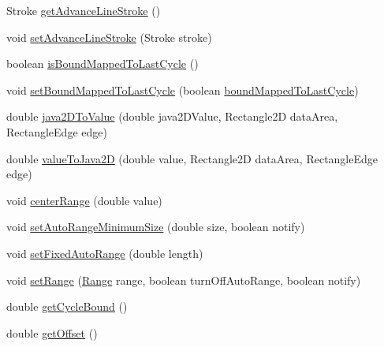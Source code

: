 \begin{DoxyCompactItemize}
Stroke \mbox{\hyperlink{classorg_1_1jfree_1_1chart_1_1axis_1_1_cyclic_number_axis_ae97337534954e16551cca918999a33fd}{get\+Advance\+Line\+Stroke}} ()
\item 
void \mbox{\hyperlink{classorg_1_1jfree_1_1chart_1_1axis_1_1_cyclic_number_axis_af8d0b2abffc3bada56961fe0e5585aa1}{set\+Advance\+Line\+Stroke}} (Stroke stroke)
\item 
boolean \mbox{\hyperlink{classorg_1_1jfree_1_1chart_1_1axis_1_1_cyclic_number_axis_a7921ca8858aa8e9d17d9ee63217f18bd}{is\+Bound\+Mapped\+To\+Last\+Cycle}} ()
\item 
void \mbox{\hyperlink{classorg_1_1jfree_1_1chart_1_1axis_1_1_cyclic_number_axis_a4e1bec37f68081a155e6743eae1f1934}{set\+Bound\+Mapped\+To\+Last\+Cycle}} (boolean \mbox{\hyperlink{classorg_1_1jfree_1_1chart_1_1axis_1_1_cyclic_number_axis_a0d7a9ffb7ad0c1644fede95a6b6a38af}{bound\+Mapped\+To\+Last\+Cycle}})
\item 
double \mbox{\hyperlink{classorg_1_1jfree_1_1chart_1_1axis_1_1_cyclic_number_axis_abd6834899322f1d8cbfdaed7aa194e38}{java2\+D\+To\+Value}} (double java2\+D\+Value, Rectangle2D data\+Area, Rectangle\+Edge edge)
\item 
double \mbox{\hyperlink{classorg_1_1jfree_1_1chart_1_1axis_1_1_cyclic_number_axis_aabdfd751dd0b6d2705e9193493aa3cc9}{value\+To\+Java2D}} (double value, Rectangle2D data\+Area, Rectangle\+Edge edge)
\item 
void \mbox{\hyperlink{classorg_1_1jfree_1_1chart_1_1axis_1_1_cyclic_number_axis_a9bd010ceed439e665084a7df97a1a8b5}{center\+Range}} (double value)
\item 
void \mbox{\hyperlink{classorg_1_1jfree_1_1chart_1_1axis_1_1_cyclic_number_axis_ac5f8722487b8bf7273414f0e2e43f34f}{set\+Auto\+Range\+Minimum\+Size}} (double size, boolean notify)
\item 
void \mbox{\hyperlink{classorg_1_1jfree_1_1chart_1_1axis_1_1_cyclic_number_axis_a19815a69702a47011236596d21c1117a}{set\+Fixed\+Auto\+Range}} (double length)
\item 
void \mbox{\hyperlink{classorg_1_1jfree_1_1chart_1_1axis_1_1_cyclic_number_axis_a8a4b79b1849b1208a4a1038fea1b4a4d}{set\+Range}} (\mbox{\hyperlink{classorg_1_1jfree_1_1data_1_1_range}{Range}} range, boolean turn\+Off\+Auto\+Range, boolean notify)
\item 
double \mbox{\hyperlink{classorg_1_1jfree_1_1chart_1_1axis_1_1_cyclic_number_axis_af988de5e084906aebb81e7f12599d827}{get\+Cycle\+Bound}} ()
\item 
double \mbox{\hyperlink{classorg_1_1jfree_1_1chart_1_1axis_1_1_cyclic_number_axis_ad80e85bfb40953029ef0d3421c0e6eaf}{get\+Offset}} ()

\end{DoxyCompactItemize}
